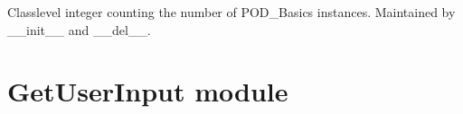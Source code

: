 \documentclass[letterpaper,10pt,english]{sphinxmanual}
\begin{document}
\begin{fulllineitems}
\begin{fulllineitems}
\end{fulllineitems}


\begin{fulllineitems}
\label{\detokenize{BasicPodProtocol:BasicPodProtocol.POD_Basics.__numPod}}
\pysigstartsignatures
{}
\pysigstopsignatures
\sphinxAtStartPar
Class\sphinxhyphen{}level integer counting the number of POD\_Basics instances.     Maintained by \_\_init\_\_ and \_\_del\_\_.

\end{fulllineitems}


\end{fulllineitems}


\sphinxstepscope


\section{GetUserInput module}
\label{\detokenize{GetUserInput:module-GetUserInput}}\label{\detokenize{GetUserInput:getuserinput-module}}\label{\detokenize{GetUserInput::doc}}
\end{document}
